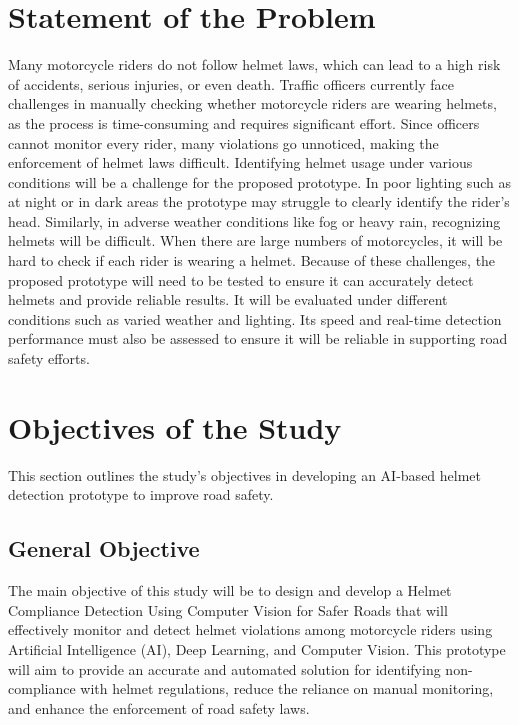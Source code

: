 \begin{refsection}
\section{Statement of the Problem}


Many motorcycle riders do not follow helmet laws, which can lead to a high risk of accidents, serious injuries, or even death. Traffic officers currently face challenges in manually checking whether motorcycle riders are wearing helmets, as the process is time-consuming and requires significant effort. Since officers cannot monitor every rider, many violations go unnoticed, making the enforcement of helmet laws difficult. Identifying helmet usage under various conditions will be a challenge for the proposed prototype. In poor lighting such as at night or in dark areas the prototype may struggle to clearly identify the rider’s head. Similarly, in adverse weather conditions like fog or heavy rain, recognizing helmets will be difficult. When there are large numbers of motorcycles, it will be hard to check if each rider is wearing a helmet. Because of these challenges, the proposed prototype will need to be tested to ensure it can accurately detect helmets and provide reliable results. It will be evaluated under different conditions such as varied weather and lighting. Its speed and real-time detection performance must also be assessed to ensure it will be reliable in supporting road safety efforts.


\section{Objectives of the Study}
This section outlines the study’s objectives in developing an AI-based helmet detection prototype to improve road safety.


\subsection{General Objective}


The main objective of this study will be to design and develop a Helmet Compliance Detection Using Computer Vision for Safer Roads that will effectively monitor and detect helmet violations among motorcycle riders using Artificial Intelligence (AI), Deep Learning, and Computer Vision. This prototype will aim to provide an accurate and automated solution for identifying non-compliance with helmet regulations, reduce the reliance on manual monitoring, and enhance the enforcement of road safety laws.



\end{refsection}
